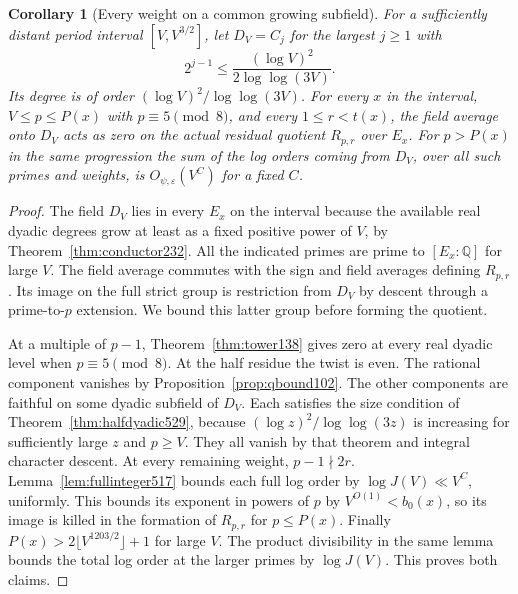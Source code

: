 \documentclass[a4paper,11pt]{article}
\newtheorem{corollary}[proposition]{Corollary}
\theoremstyle{definition}
\theoremstyle{remark}
\numberwithin{equation}{section}
\begin{document}
\begin{corollary}[Every weight on a common growing subfield]
\leavevmode\label{cor:allweightlayer529}
For a sufficiently distant period interval \([V,V^{3/2}]\), let
\(D_V=C_j\) for the largest \(j\ge1\) with
\[
       2^{j-1}\le \frac{(\log V)^2}{2\log\log(3V)} .
\]
Its degree is of order \((\log V)^2/\log\log(3V)\).
For every \(x\) in the interval, \(V\le p\le P(x)\) with
\(p\equiv5\pmod8\), and every \(1\le r<t(x)\), the field
average onto \(D_V\) acts as zero on the actual residual quotient
\(R_{p,r}\) over \(E_x\). For \(p>P(x)\) in the same progression
the sum of the log orders coming from \(D_V\), over all such primes
and weights, is \(O_{\psi,\varepsilon}(V^C)\) for a fixed \(C\).
\end{corollary}
\begin{proof}
The field \(D_V\) lies in every \(E_x\) on the interval because
the available real dyadic degrees grow at least as a fixed positive
power of \(V\), by Theorem~\ref{thm:conductor232}. All the indicated
primes are prime to \([E_x:\mathbb Q]\) for large \(V\). The
field average commutes with the sign and field averages defining
\(R_{p,r}\). Its image on the full strict group is restriction
from \(D_V\) by descent through a prime-to-\(p\) extension.
We bound this latter group before forming the quotient.

At a multiple of \(p-1\), Theorem~\ref{thm:tower138} gives zero at
every real dyadic level when \(p\equiv5\pmod8\). At the half residue
the twist is even. The rational component vanishes by
Proposition~\ref{prop:qbound102}. The other components are faithful
on some dyadic subfield of \(D_V\). Each satisfies the size condition
of Theorem~\ref{thm:halfdyadic529}, because
\((\log z)^2/\log\log(3z)\) is increasing for sufficiently large
\(z\) and \(p\ge V\). They all vanish by that theorem and integral
character descent.
At every remaining weight, \(p-1\nmid2r\).
Lemma~\ref{lem:fullinteger517} bounds each full log order by
\(\log J(V)\ll V^C\), uniformly. This bounds its exponent in
powers of \(p\) by \(V^{O(1)}< b_0(x)\), so its image is killed
in the formation of \(R_{p,r}\) for \(p\le P(x)\).
Finally \(P(x)>2\lfloor V^{1203/2}\rfloor+1\) for large \(V\).
The product divisibility in the same lemma bounds the total log
order at the larger primes by \(\log J(V)\). This proves both claims.
\end{proof}
\end{document}
